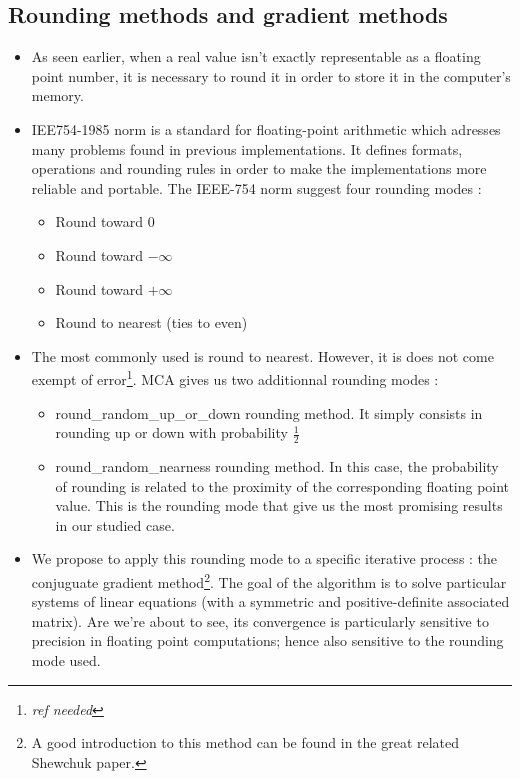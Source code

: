 \documentclass[a4paper,11pt]{article}
\let\cite=\supercite
\begin{document}
\subsection{Rounding methods and gradient methods}
\begin{itemize}
  \item As seen earlier, when a real value isn't exactly representable as a floating point number, it is necessary to round it in order to store it in the computer's memory. 
  \item IEE754-1985 norm is a standard for floating-point arithmetic which adresses many problems found in previous implementations. It defines formats, operations and rounding rules in order to make the implementations more reliable and portable. The IEEE-754 norm suggest four rounding modes\cite{zuras2008ieee} :
  \begin{itemize}
    \item Round toward $0$
    \item Round toward $-\infty$
    \item Round toward $+\infty$
    \item Round to nearest (ties to even)
  \end{itemize}
  \item The most commonly used is round to nearest. However, it is does not come exempt of error\footnote{\emph{ref needed}}. MCA gives us two additionnal rounding modes : 
  \begin{itemize}
    \item {\ttfamily round\_random\_up\_or\_down} rounding method. It simply consists in rounding up or down with probability $\frac{1}{2}$
    \item {\ttfamily round\_random\_nearness} rounding method. In this case, the probability of rounding is related to the proximity of the corresponding floating point value. This is the rounding mode that give us the most promising results in our studied case. %
  \end{itemize} %
  \item We propose to apply this rounding mode to a specific iterative process : the conjuguate gradient method\footnote{A good introduction to this method can be found in the great related Shewchuk paper\cite{shewchuk1994introduction}.}. The goal of the algorithm is to solve particular systems of linear equations (with a symmetric and positive-definite associated matrix). Are we're about to see, its convergence is particularly sensitive to precision in floating point computations; hence also sensitive to the rounding mode used. %
\end{itemize}
\end{document}
